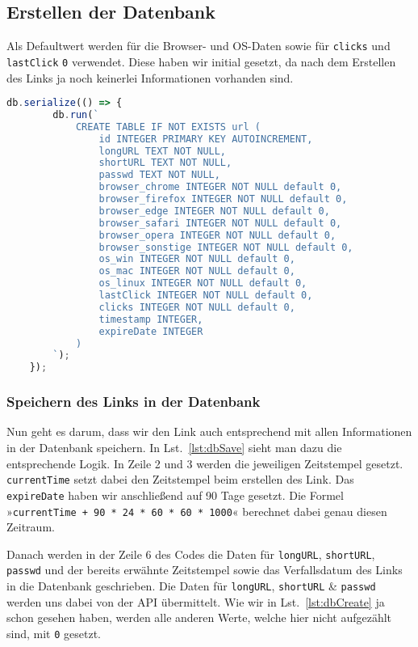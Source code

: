 \documentclass[a4paper,11pt,DIV=12]{scrreprt}%
\begin{document}
\subsection{Erstellen der Datenbank}
Als Defaultwert werden für die Browser- und OS-Daten sowie für \texttt{clicks} und \texttt{lastClick} \texttt{0} verwendet. Diese haben wir initial gesetzt, da nach dem Erstellen des Links ja noch keinerlei Informationen vorhanden sind.

\begin{lstlisting}[language=JavaScript,
    caption={Die Statistiken werden initial auf 0 gesetzt, der Timestamp ist der Datumswert der Erstellung des Eintrags},
    label={lst:dbCreate},
    float=h,
    gobble=4
]
    db.serialize(() => {
        db.run(`
            CREATE TABLE IF NOT EXISTS url (
                id INTEGER PRIMARY KEY AUTOINCREMENT,
                longURL TEXT NOT NULL,
                shortURL TEXT NOT NULL,
                passwd TEXT NOT NULL,
                browser_chrome INTEGER NOT NULL default 0,
                browser_firefox INTEGER NOT NULL default 0,
                browser_edge INTEGER NOT NULL default 0,
                browser_safari INTEGER NOT NULL default 0,
                browser_opera INTEGER NOT NULL default 0,
                browser_sonstige INTEGER NOT NULL default 0,
                os_win INTEGER NOT NULL default 0,
                os_mac INTEGER NOT NULL default 0,
                os_linux INTEGER NOT NULL default 0,
                lastClick INTEGER NOT NULL default 0,
                clicks INTEGER NOT NULL default 0,
                timestamp INTEGER,
                expireDate INTEGER
            )
        `);
    });
\end{lstlisting}

\subsubsection{Speichern des Links in der Datenbank}
Nun geht es darum, dass wir den Link auch entsprechend mit allen Informationen in der Datenbank speichern. In Lst.~\ref{lst:dbSave} sieht man dazu die entsprechende Logik. 
In Zeile 2 und 3 werden die jeweiligen Zeitstempel gesetzt. \texttt{currentTime} setzt dabei den Zeitstempel beim erstellen des Link. Das \texttt{expireDate} haben wir anschließend auf 90 Tage gesetzt. Die Formel »\texttt{currentTime + 90 * 24 * 60 * 60 * 1000}« berechnet dabei genau diesen Zeitraum.

Danach werden in der Zeile 6 des Codes die Daten für \texttt{longURL}, \texttt{shortURL}, \texttt{passwd} und der bereits erwähnte Zeitstempel sowie das Verfallsdatum des Links in die Datenbank geschrieben. Die Daten für \texttt{longURL}, \texttt{shortURL} \& \texttt{passwd} werden uns dabei von der API übermittelt.
Wie wir in Lst.~\ref{lst:dbCreate} ja schon gesehen haben, werden alle anderen Werte, welche hier nicht aufgezählt sind, mit \texttt{0} gesetzt. 
\end{document}
